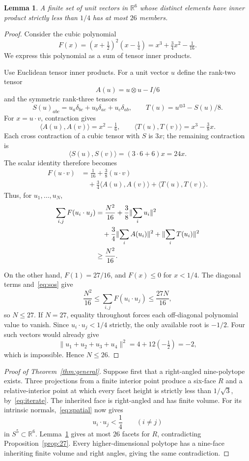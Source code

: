 \documentclass[11pt]{article}
\newtheorem{lemma}[theorem]{Lemma}
\theoremstyle{remark}
\newcommand{\RR}{\mathbb R}
\newcommand{\ip}[2]{\langle #1,#2\rangle}
\newcommand{\norm}[1]{\lVert #1\rVert}
\begin{document}
\begin{lemma}\label{lem:26}
A finite set of unit vectors in $\RR^6$ whose distinct elements have
inner product strictly less than $1/4$ has at most $26$ members.
\end{lemma}
\begin{proof}
Consider the cubic polynomial
\begin{equation}\label{eq:polynomial}
 F(x)=(x+\tfrac12)^2(x-\tfrac14)
     =x^3+\tfrac34x^2-\tfrac1{16}.
\end{equation}
We express this polynomial as a sum of tensor inner products.

Use Euclidean tensor inner products. For a unit vector $u$
define the rank-two tensor
\[
 A(u)=u\otimes u-I/6
\]
and the symmetric rank-three tensors
\[
 S(u)_{abc}=u_a\delta_{bc}+u_b\delta_{ac}+u_c\delta_{ab},
 \qquad T(u)=u^{\otimes3}-S(u)/8.
\]
For $x=u\cdot v$, contraction gives
\begin{equation}\label{eq:kernels}
 \ip{A(u)}{A(v)}=x^2-\tfrac16,
 \qquad \ip{T(u)}{T(v)}=x^3-\tfrac38x.
\end{equation}
Each cross contraction of a cubic tensor with $S$ is $3x$; the
remaining contraction is
\[
 \ip{S(u)}{S(v)}=(3\cdot6+6)x=24x.
\]
The scalar identity therefore becomes
\begin{align*}
 F(u\cdot v)&=\tfrac1{16}+\tfrac38(u\cdot v)\\
 &\quad+\tfrac34\ip{A(u)}{A(v)}+\ip{T(u)}{T(v)}.
\end{align*}
Thus, for $u_1,\ldots,u_N$,
\begin{align}
 \sum_{i,j}F(u_i\cdot u_j)
 &=\frac{N^2}{16}+\frac38\norm{\sum_i u_i}^2\notag\\
 &\quad+\frac34\norm{\sum_i A(u_i)}^2
   +\norm{\sum_i T(u_i)}^2\notag\\
 &\ge\frac{N^2}{16}.\label{eq:sos}
\end{align}

On the other hand, $F(1)=27/16$, and $F(x)\le0$ for $x<1/4$.
The diagonal terms and~\eqref{eq:sos} give
\[
 \frac{N^2}{16}\le\sum_{i,j}F(u_i\cdot u_j)\le\frac{27N}{16},
\]
so $N\le27$. If $N=27$, equality throughout forces each
off-diagonal polynomial value to vanish. Since $u_i\cdot u_j<1/4$
strictly, the only available root is $-1/2$. Four such vectors would
already give
\[
 \norm{u_1+u_2+u_3+u_4}^2=4+12(-\tfrac12)=-2,
\]
which is impossible. Hence $N\le26$.
\end{proof}

\begin{proof}[Proof of Theorem~\ref{thm:general}]
Suppose first that a right-angled nine-polytope exists. Three
projections from a finite interior point produce a six-face
$R$ and a relative-interior point at which every facet height is
strictly less than $1/\sqrt3$, by~\eqref{eq:iterate}.
The inherited face is right-angled and has finite volume.
For its intrinsic normals,~\eqref{eq:spatial} now gives
\[
 u_i\cdot u_j<\frac14\qquad(i\ne j)
\]
in $S^5\subset\RR^6$. Lemma~\ref{lem:26} gives at most $26$
facets for $R$, contradicting Proposition~\ref{prop:27}.
Every higher-dimensional polytope has a nine-face inheriting finite
volume and right angles, giving the same contradiction.
\end{proof}
\end{document}
